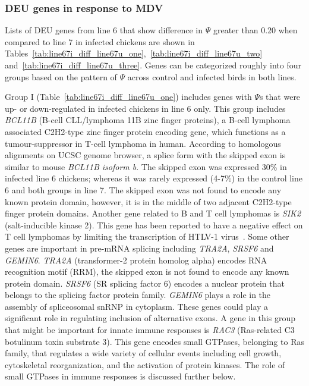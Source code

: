 \documentclass[10pt]{article}
\begin{document}
\subsubsection*{DEU genes in response to MDV}

Lists of DEU genes from line 6 that show difference in $\Psi$ greater than 0.20
when compared to line 7 in infected chickens are shown in
Tables~\ref{tab:line67i_diff_line67u_one},~\ref{tab:line67i_diff_line67u_two}
and~\ref{tab:line67i_diff_line67u_three}.  Genes can be categorized roughly into
four groups based on the pattern of $\Psi$ across control and infected birds in
both lines.

Group I (Table~\ref{tab:line67i_diff_line67u_one}) includes genes with $\Psi$s
that were up- or down-regulated in infected chickens in line 6 only.  This group
includes {\em BCL11B} (B-cell CLL/lymphoma 11B zinc finger proteins), a B-cell
lymphoma associated C2H2-type zinc finger protein encoding gene, which functions
as a tumour-suppressor in T-cell lymphoma in human.  According to homologous
alignments on UCSC genome browser, a splice form with the skipped exon is
similar to mouse {\em BCL11B isoform b}.  The skipped exon was expressed 30\% in
infected line 6 chickens; whereas it was rarely expressed (4-7\%) in the control
line 6 and both groups in line 7.  The skipped exon was not found to encode any
known protein domain, however, it is in the middle of two adjacent C2H2-type
finger protein domains.  Another gene related to B and T cell lymphomas is {\em
SIK2} (salt-inducible kinase 2).  This gene has been reported to have a negative
effect on T cell lymphomas by limiting the transcription of HTLV-1
virus~\cite{tang2013lkb1}.  Some other genes are important in pre-mRNA splicing
including {\em TRA2A}, {\em SRSF6} and {\em GEMIN6}.  {\em TRA2A} (transformer-2
protein homolog alpha) encodes RNA recognition motif (RRM), the skipped exon is
not found to encode any known protein domain.  {\em SRSF6} (SR splicing factor
6) encodes a nuclear protein that belongs to the splicing factor protein family.
{\em GEMIN6} plays a role in the assembly of spliceosomal snRNP in cytoplasm.
These genes could play a significant role in regulating inclusion of alternative
exons.  A gene in this group that might be important for innate immune responses
is {\em RAC3} (Ras-related C3 botulinum toxin substrate 3).  This gene encodes
small GTPases, belonging to Ras family, that regulates a wide variety of
cellular events including cell growth, cytoskeletal reorganization, and the
activation of protein kinases.  The role of small GTPases in immune responses is
discussed further below.
\end{document}

